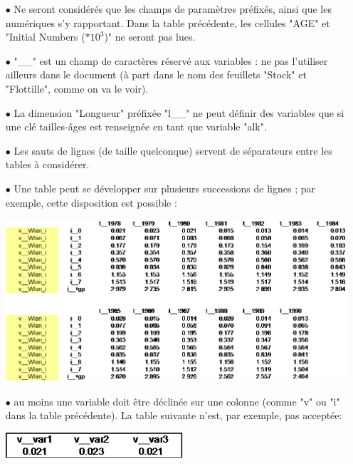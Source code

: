 \documentclass[12pt, colorinlistoftodos, notitlepage]{report}
\newenvironment{not used}[1]{%
    \longtable{%
        |>{\centering$\displaystyle}A{#1}{1}<{$}%
        |}\hline\ignorespaces}{%
    \endlongtable\ignorespacesafterend}
\begin{document}
\begin{itemize}
    \item[$\bullet$] Ne seront considérés que les champs de paramètres préfixés, ainsi que les numériques s'y rapportant. Dans la table précédente, les cellules "AGE" et "Initial Numbers ($*10^3$)" ne seront pas lues. 
    \item[$\bullet$] "\_\_" est un champ de caractères réservé aux variables : ne pas l'utiliser ailleurs dans le document (à part dans le nom des feuillets "Stock" et "Flottille", comme on va le voir).
    \item[$\bullet$] La dimension "Longueur" préfixée "l\_\_" ne peut définir des variables que si une clé tailles-âges est renseignée en tant que variable "alk".
    \item[$\bullet$] Les sauts de lignes (de taille quelconque) servent de séparateurs entre les tables à considérer.
    \item[$\bullet$] Une table peut se développer sur plusieurs successions de lignes ; par exemple, cette disposition est possible :
    
    \begin{minipage}{\linewidth}
        \centering
        \includegraphics[width = \textwidth]{figures/param/stock5.png}
    \end{minipage}
    \vspace{12pt}

    \item[$\bullet$] au moins une variable doit être déclinée sur une colonne (comme "v" ou "i" dans la table précédente). La table suivante n'est, par exemple, pas acceptée:
    
    \begin{minipage}{\linewidth}
        \centering
        \includegraphics[width = 6.6cm]{figures/param/stock6.png}
    \end{minipage}
    \vspace{12pt}


\end{itemize}
\end{document}
